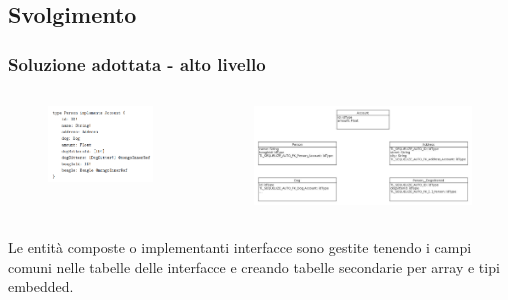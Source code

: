 \documentclass[c]{beamer}
\begin{document}
        \subsection{Svolgimento}
            \begin{frame}
                \frametitle{Soluzione adottata - alto livello}
                \begin{columns}
                    \begin{figure}
                        \includegraphics[scale=0.28]{Tipo_difficile.png}
                    \end{figure}
                    \begin{figure}
                        \includegraphics[scale=0.24]{../db-example.jpg}
                    \end{figure}
                \end{columns}
                \vfill
                Le entità composte o implementanti interfacce sono gestite tenendo i campi comuni nelle tabelle delle interfacce e creando tabelle secondarie per array e tipi embedded.
            \end{frame}
\end{document}
